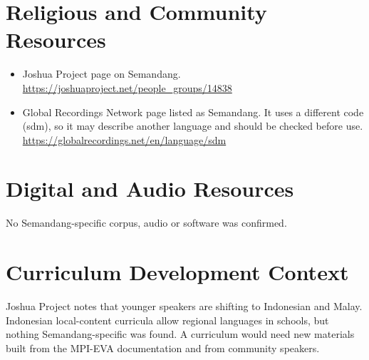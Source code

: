 \documentclass[12pt]{article}
\begin{document}
\section{Religious and Community Resources}
\begin{itemize}
\item Joshua Project page on Semandang. \url{https://joshuaproject.net/people_groups/14838}
\item Global Recordings Network page listed as Semandang. It uses a different code (sdm), so it may describe another language and should be checked before use. \url{https://globalrecordings.net/en/language/sdm}
\end{itemize}

\section{Digital and Audio Resources}
No Semandang-specific corpus, audio or software was confirmed.

\section{Curriculum Development Context}
Joshua Project notes that younger speakers are shifting to Indonesian and Malay. Indonesian local-content curricula allow regional languages in schools, but nothing Semandang-specific was found. A curriculum would need new materials built from the MPI-EVA documentation and from community speakers.
\end{document}
